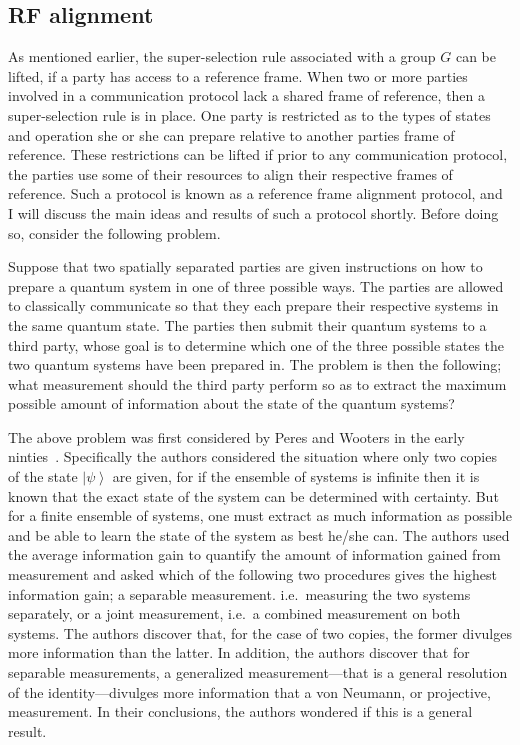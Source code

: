 \documentclass{article}
\newcommand{\ket}[1]{\left|#1\right\rangle}
\begin{document}
\subsection{RF alignment}
As mentioned earlier, the super-selection rule associated with a group $G$ can be lifted, if a party has access to a reference frame.  When two or more parties involved in a communication protocol lack a shared frame of reference, then a super-selection rule is in place.  One party is restricted as to the types of states and operation she or she can prepare relative to another parties frame of reference.  These restrictions can be lifted if prior to any communication protocol, the parties use some of their resources to align their respective frames of reference.  Such a protocol is known as a reference frame alignment protocol, and I will discuss the main ideas and results of such a protocol shortly.  Before doing so, consider the following problem.

Suppose that two spatially separated parties are given instructions on how to prepare a quantum system in one of three possible ways.  The parties are allowed to classically communicate so that they each prepare their respective systems in the same quantum state.  The parties then submit their quantum systems to a third party, whose goal is to determine which one of the three possible states the two quantum systems have been prepared in.  The problem is then the following;  what measurement should the third party perform so as to extract the maximum possible amount of information about the state of the quantum systems?

The above problem was first considered by Peres and Wooters in the early ninties~\cite{PW90}.  Specifically the authors considered the situation where only two copies of the state $\ket{\psi}$ are given, for if the ensemble of systems is infinite then it is known that the exact state of the system can be determined with certainty.  But for a finite ensemble of systems, one must extract as much information as possible and be able to learn the state of the system as best he/she can.  The authors used the average information gain to quantify the amount of information gained from measurement and asked which of the following two procedures gives the highest information gain;  a separable measurement. i.e.~measuring the two systems separately, or a joint measurement, i.e.~a combined measurement on both systems.  The authors discover that, for the case of two copies, the former divulges more information than the latter.  In addition, the authors discover that for separable measurements, a generalized measurement---that is a general resolution of the identity---divulges more information that a von Neumann, or projective, measurement.  In their conclusions, the authors wondered if this is a general result.
\end{document}
